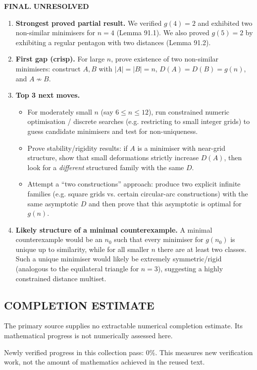 \medskip
\noindent\textbf{FINAL.} \textbf{UNRESOLVED}
\begin{enumerate}
\item[(i)] \textbf{Strongest proved partial result.}
We verified $g(4)=2$ and exhibited two non-similar minimisers for $n=4$ (Lemma 91.1). We also proved $g(5)=2$ by exhibiting a regular pentagon with two distances (Lemma 91.2).
\item[(ii)] \textbf{First gap (crisp).}
For large $n$, prove existence of two non-similar minimisers: construct $A,B$ with $|A|=|B|=n$, $D(A)=D(B)=g(n)$, and $A\not\sim B$.
\item[(iii)] \textbf{Top 3 next moves.}
\begin{itemize}
\item For moderately small $n$ (say $6\le n\le 12$), run constrained numeric optimisation / discrete searches (e.g. restricting to small integer grids) to guess candidate minimisers and test for non-uniqueness.
\item Prove stability/rigidity results: if $A$ is a minimiser with near-grid structure, show that small deformations strictly increase $D(A)$, then look for a \emph{different} structured family with the same $D$.
\item Attempt a ``two constructions'' approach: produce two explicit infinite families (e.g. square grids vs. certain circular-arc constructions) with the same asymptotic $D$ and then prove that this asymptotic is optimal for $g(n)$.
\end{itemize}
\item[(iv)] \textbf{Likely structure of a minimal counterexample.}
A minimal counterexample would be an $n_0$ such that every minimiser for $g(n_0)$ is unique up to similarity, while for all smaller $n$ there are at least two classes. Such a unique minimiser would likely be extremely symmetric/rigid (analogous to the equilateral triangle for $n=3$), suggesting a highly constrained distance multiset.
\end{enumerate}




\subsection*{COMPLETION ESTIMATE}
The primary source supplies no extractable numerical completion estimate. Its mathematical progress is not numerically assessed here.

Newly verified progress in this collection pass: $0\%$. This measures new verification work, not the amount of mathematics achieved in the reused text.
